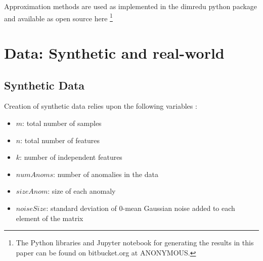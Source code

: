 \documentclass[conference]{IEEEtran}
\begin{document}
Approximation methods are used as implemented in the dimredu python package and available as open source here
\footnote{The Python libraries and Jupyter notebook for generating the results in this paper can be found on bitbucket.org at ANONYMOUS.}

\section{Data: Synthetic and real-world}

\subsection{Synthetic Data}

Creation of synthetic data relies upon the following variables :
\begin{itemize}
\item $m$: total number of samples
\item $n$: total number of features 
\item $k$: number of independent features
\item $numAnoms$: number of anomalies in the data
\item $sizeAnom$: size of each anomaly
\item $noiseSize$: standard deviation of $0$-mean Gaussian noise added to each element of the matrix 
\end{itemize}
\end{document}
